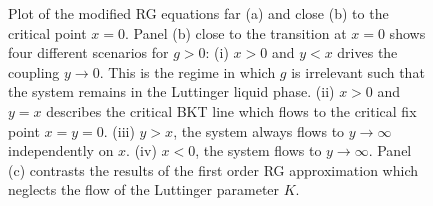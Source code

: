 \begin{figure}
    \caption{Plot of the modified RG equations far (a) and close (b) to the critical point $x=0$. Panel (b) close to the transition at $x=0$ shows four different scenarios for $g>0$: (i) $x>0$ and $y<x$ drives the coupling $y\rightarrow0$. This is the regime in which $g$ is irrelevant such that the system remains in the Luttinger liquid phase. (ii) $x>0$ and $y=x$ describes the critical BKT line which flows to the critical fix point $x=y=0$. (iii) $y>x$, the system always flows to $y\rightarrow\infty$ independently on $x$. (iv) $x<0$, the system flows to $y\rightarrow\infty$. Panel (c) contrasts the results of the first order RG approximation which neglects the flow of the Luttinger parameter $K$.}
    \label{fig:bkt_flow_equations}
\end{figure}
%
%
